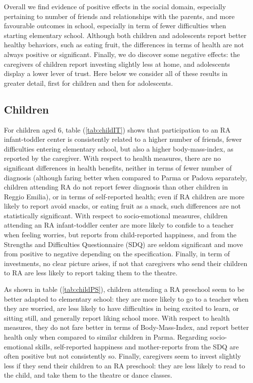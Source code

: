 \documentclass[12pt]{article}
\begin{document}
Overall we find evidence of positive effects in the social domain, especially pertaining to number of friends and relationships with the parents, and more favourable outcomes in school, especially in term of fewer difficulties when starting elementary school. Although both children and adolescents report better healthy behaviors, such as eating fruit, the differences in terms of health are not always positive or significant. Finally, we do discover some negative effects: the caregivers of children report investing slightly less at home, and adolescents display a lower lever of trust. Here below we consider all of these results in greater detail, first for children and then for adolescents.

\subsection{Children}
For children aged 6, table (\ref{tab:childIT}) shows that participation to an RA infant-toddler center is consistently related to a higher number of friends, fewer difficulties entering elementary school, but also a higher body-mass-index, as reported by the caregiver. 
With respect to health measures, there are no significant differences in health benefits, neither in terms of fewer number of diagnosis (although faring better when compared to Parma or Padova separately, children attending RA do not report fewer diagnosis than other children in Reggio Emilia), or in terms of self-reported health; even if RA children are more likely to report avoid snacks, or eating fruit as a snack, such differences are not statistically significant.
With respect to socio-emotional measures, children attending an RA infant-toddler center are more likely to confide to a teacher when feeling worries, but reports from child-reported happiness, and from the Strengths and Difficulties Questionnaire (SDQ) are seldom significant and move from positive to negative depending on the specification.
Finally, in term of investments, no clear picture arises, if not that caregivers who send their children to RA are less likely to report taking them to the theatre.

As shown in table (\ref{tab:childPS}), children attending a RA preschool seem to be better adapted to elementary school: they are more likely to go to a teacher when they are worried, are less likely to have difficulties in being excited to learn, or sitting still, and generally report liking school more.
With respect to health measures, they do not fare better in terms of Body-Mass-Index, and report better health only when compared to similar children in Parma. 
Regarding socio-emotional skills, self-reported happiness and mother-reports from the SDQ are often positive but not consistently so.
Finally, caregivers seem to invest slightly less if they send their children to an RA preschool: they are less likely to read to the child, and take them to the theatre or dance classes.
\end{document}
